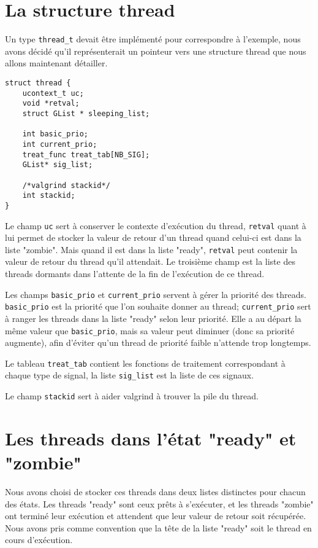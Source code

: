 \section {La structure thread}

Un type \verb'thread_t' devait être implémenté pour correspondre à
l'exemple, nous avons décidé qu'il représenterait un pointeur vers une
structure thread que nous allons maintenant détailler.\\

\begin{verbatim}
struct thread {
    ucontext_t uc;
    void *retval;
    struct GList * sleeping_list;

    int basic_prio;
    int current_prio;
    treat_func treat_tab[NB_SIG];
    GList* sig_list;

    /*valgrind stackid*/
    int stackid;
}
\end{verbatim}

Le champ \verb'uc' sert à conserver le contexte d'exécution du thread,
\verb'retval' quant à lui permet de stocker la valeur de retour d'un
thread quand celui-ci est dans la liste "zombie". Mais quand il est
dans la liste "ready", \verb'retval' peut contenir la valeur de retour
du thread qu'il attendait. Le troisième champ est la liste des threads
dormants dans l'attente de la fin de l'exécution de ce thread. 

Les champs \verb$basic_prio$ et \verb$current_prio$ servent à gérer la
priorité des threads.  \verb$basic_prio$ est la priorité que l'on
souhaite donner au thread; \verb$current_prio$ sert à ranger les
threads dans la liste "ready" selon leur priorité. Elle a au départ la
même valeur que \verb$basic_prio$, mais sa valeur peut diminuer (donc
sa priorité augmente), afin d'éviter qu'un thread de priorité faible
n'attende trop longtemps.

Le tableau \verb$treat_tab$ contient les fonctions de traitement
correspondant à chaque type de signal, la liste \verb$sig_list$ est la
liste de ces signaux.

Le champ \verb$stackid$ sert à aider valgrind à trouver la pile du thread. 

\section {Les threads dans l'état "ready" et "zombie"}

Nous avons choisi de stocker ces threads dans deux listes distinctes
pour chacun des états. Les threads "ready" sont ceux prêts à
s'exécuter, et les threads "zombie" ont terminé leur exécution et
attendent que leur valeur de retour soit récupérée.\\ Nous avons pris
comme convention que la tête de la liste "ready" soit le thread en
cours d'exécution.

